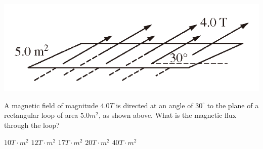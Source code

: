 
\begin{center}
\includegraphics[scale=0.5]{images/33.png}
\end{center}

\begin{questions}
\setcounter{question}{32}

\question
A magnetic field of magnitude $4.0 \unit{T}$ is directed at an angle of $30^{\circ}$ to the plane of a rectangular loop of area $5.0 \unit{m^2}$, as shown above. What is the magnetic flux through the loop?

\begin{oneparchoices}
    \choice $10 \unit{T \cdot m^2}$
    \choice $12 \unit{T \cdot m^2}$
    \choice $17 \unit{T \cdot m^2}$
    \choice $20 \unit{T \cdot m^2}$
    \choice $40 \unit{T \cdot m^2}$
\end{oneparchoices}

\end{questions}
